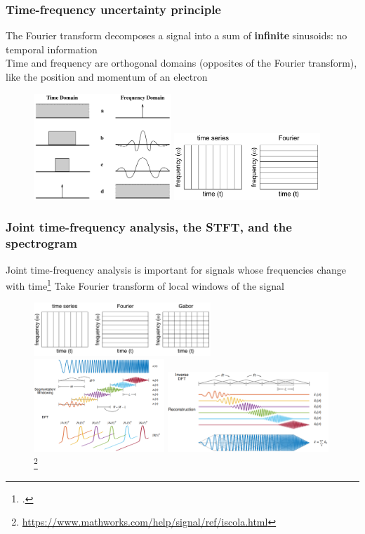 \documentclass[usenames,dvipsnames]{beamer}
\begin{document}
\begin{frame}
	\frametitle{Time-frequency uncertainty principle}
	The Fourier transform decomposes a signal into a sum of \textbf{infinite} sinusoids: no temporal information\\
	Time and frequency are orthogonal domains (opposites of the Fourier transform), like the position and momentum of an electron
	\begin{figure}
		\includegraphics[height=4cm]{./images-tftheory/gabor13.png}
		\includegraphics[height=2.5cm]{./images-mila-presentation/gabor5.png}
	\end{figure}
\end{frame}

\begin{frame}
	\frametitle{Joint time-frequency analysis, the STFT, and the spectrogram}
	Joint time-frequency analysis is important for signals whose frequencies change with time\footcite{gabor1946} Take Fourier transform of local windows of the signal
	\begin{figure}
		\includegraphics[height=2cm]{./images-tftheory/gabor3.png}\\
		\includegraphics[height=3.5cm]{./images-mila-presentation/stft_diagram1.png}
		\hspace{-0.75em}
		\includegraphics[height=3cm]{./images-mila-presentation/stft_diagram2.png}\footnote{\url{https://www.mathworks.com/help/signal/ref/iscola.html}}
	\end{figure}
\end{frame}
\end{document}
